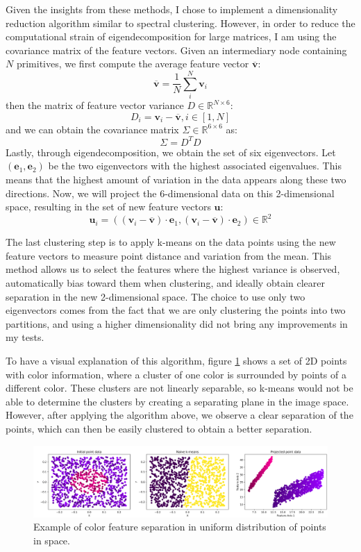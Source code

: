 Given the insights from these methods, I chose to implement a dimensionality reduction algorithm similar to spectral clustering. However, in order to reduce the computational strain of eigendecomposition for large matrices, I am using the covariance matrix of the feature vectors. Given an intermediary node containing $N$ primitives, we first compute the average feature vector $\bm{\overline{v}}$:
\[
\bm{\overline{v}} = \frac{1}{N} \sum_i^N \bm{v}_i
\]
then the matrix of feature vector variance $D \in \mathbb{R}^{N \times 6}$:
\[
D_i = \bm{v}_i - \bm{\overline{v}}, i \in [1, N] 
\]
and we can obtain the covariance matrix $\Sigma \in \mathbb{R}^{6 \times 6}$ as:
\[
\Sigma = D^T D
\]
Lastly, through eigendecomposition, we obtain the set of six eigenvectors. Let $(\bm{e}_1, \bm{e}_2)$ be the two eigenvectors with the highest associated eigenvalues. This means that the highest amount of variation in the data appears along these two directions. Now, we will project the 6-dimensional data on this 2-dimensional space, resulting in the set of new feature vectors $\bm{u}$:
\[
\bm{u}_i = ((\bm{v}_i - \bm{\overline{v}}) \cdot \bm{e}_1, (\bm{v}_i - \bm{\overline{v}}) \cdot \bm{e}_2) \in \mathbb{R}^2
\]

The last clustering step is to apply k-means on the data points using the new feature vectors to measure point distance and variation from the mean. This method allows us to select the features where the highest variance is observed, automatically bias toward them when clustering, and ideally obtain clearer separation in the new 2-dimensional space. The choice to use only two eigenvectors comes from the fact that we are only clustering the points into two partitions, and using a higher dimensionality did not bring any improvements in my tests. 

To have a visual explanation of this algorithm, figure \ref{fig:cluster_color} shows a set of 2D points with color information, where a cluster of one color is surrounded by points of a different color. These clusters are not linearly separable, so k-means would not be able to determine the clusters by creating a separating plane in the image space. However, after applying the algorithm above, we observe a clear separation of the points, which can then be easily clustered to obtain a better separation. 

\begin{figure}[H]
    \centering
    \includegraphics[width=\linewidth]{figures/clustering_color.png}
    \caption{Example of color feature separation in uniform distribution of points in space.}
    \label{fig:cluster_color}
\end{figure}

